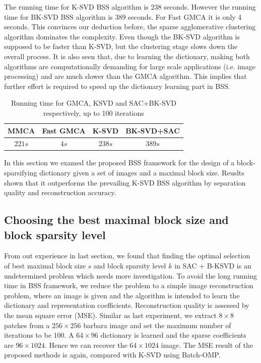 The running time for K-SVD BSS algorithm is 238 seconds. However the running time for BK-SVD BSS algorithm is 389 seconds. For Fast GMCA it is only 4 seconds. This convinces our deduction before, the sparse agglomerative clustering algorithm dominates the complexity. Even though the BK-SVD algorithm is supposed to be faster than K-SVD, but the clustering stage slows down the overall process. It is also seen that, due to learning the dictionary, making both algorithms are computationally demanding for large scale applications (i.e. image processing) and are much slower than the GMCA algorithm. This implies that further effert is required to speed up the dictionary learning part in BSS. \\
\begin{table}[!htbp]
\centering
    \begin{tabular}{|c|c|c|c|}
    \hline
    MMCA & Fast GMCA & K-SVD & BK-SVD+SAC \\\hline
    $221s$ & $4s$ & $238s$ & $389s$ \\\hline
    \end{tabular}
    \caption{Running time for GMCA, KSVD and SAC+BK-SVD respectively, up to 100 iterations}
\end{table}

In this section we examed the proposed BSS framework for the design of a block-sparsifying dictionary given a set of images and a maximal block size. Reuslts shown that it outperforms the prevailing K-SVD BSS algorithm by separation quality and reconstruction accuracy.

\subsection{Choosing the best maximal block size and block sparsity level}
From out experience in last section, we found that finding the optimal selection of best maximal block size $s$ and block sparsity level $k$ in SAC + B-KSVD is an undetermined problem which needs more investigation. To avoid the long running time in BSS framework, we reduce the problem to a simple image reconstruction problem, where an image is given and the algorithm is intended to learn the dictionary and representation coefficients. Reconstruction quality is assessed by the mean square error (MSE). Similar as last experiment, we extract $8 \times 8$ patches from a $256 \times 256$ barbara image and set the maximum number of iterations to be 100. A $64 \times 96$ dictionary is learned and the sparse coefficients are $96\times1024$. Hence we can recover the $64\times1024$ image. The MSE result of the proposed methods is again, compared with K-SVD using Batch-OMP.\\


